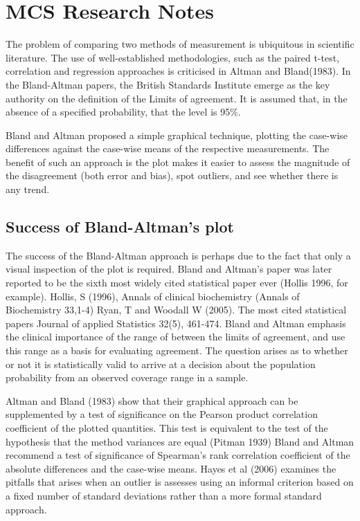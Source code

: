 \section{MCS Research Notes}
The problem of comparing two methods of measurement is ubiquitous in scientific literature.
The use of  well-established methodologies, such as the paired t-test, correlation and regression approaches is criticised in Altman and Bland(1983).
In the Bland-Altman papers, the British Standards Institute emerge as the key authority on the definition of the Limits of agreement.
It is assumed that, in the absence of a specified probability, that the level is 95\%.

Bland and Altman proposed a simple graphical technique, plotting the case-wise differences against the case-wise means of the respective measurements.
The benefit of such an approach is the plot makes it easier to assess the magnitude of the disagreement (both error and bias), spot outliers, and see whether there is any trend.

\subsection{Success of Bland-Altman’s plot}
The success of the Bland-Altman approach is perhaps due to the fact that only a visual inspection of the plot is required. Bland and Altman’s paper was later reported to be the sixth most widely cited statistical paper ever (Hollis 1996, for example).
	Hollis, S (1996), Annals of clinical biochemistry (Annals of Biochemistry 33,1-4)
Ryan, T and Woodall W (2005). The most cited statistical papers Journal of applied Statistics 32(5), 461-474.
Bland and Altman emphasis the clinical importance of the range of between the limits of agreement, and use this range as a basis for evaluating agreement.
The question arises as to whether  or not it is statistically valid to arrive at a decision about the population probability from an observed coverage range in a sample.

Altman and Bland (1983) show that their graphical approach can be supplemented by a test of significance on the Pearson product correlation coefficient of the plotted quantities. This test is equivalent to the test of the hypothesis that the method variances are equal (Pitman 1939)
Bland and Altman recommend a test of significance of Spearman’s rank correlation coefficient of the absolute differences and the case-wise means.
Hayes et al (2006) examines the pitfalls that arises when an outlier is assesses using an informal criterion based on a fixed number of standard deviations rather than a more formal standard approach.
